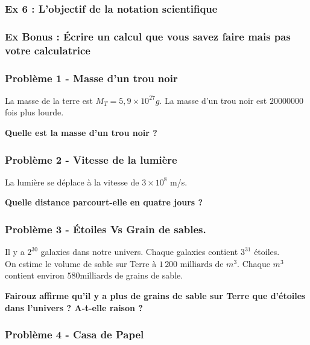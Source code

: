 \subsubsection*{Ex 6 : L'objectif de la notation scientifique}
\Pointilles[2]

\subsubsection*{Ex Bonus : Écrire un calcul que vous savez faire mais pas votre calculatrice}
\Pointilles[2]


\newpage

\subsubsection*{Problème 1 - Masse d'un trou noir}

La masse de la terre est $M_T = 5,9 \times 10^27 g$. La masse d'un trou noir est $\SI{20000000}{}$ fois plus lourde. 

\textbf{Quelle est la masse d'un trou noir ?}

\Pointilles[4]

\subsubsection*{Problème 2 - Vitesse de la lumière}

La lumière se déplace à la vitesse de $3 \times 10^8$ m/s. 

\textbf{Quelle distance parcourt-elle en quatre jours ?}

\Pointilles[4]

\subsubsection*{Problème 3 - Étoiles Vs Grain de sables.}

Il y a $2^{30}$ galaxies dans notre univers. Chaque galaxies contient $3^{31}$ étoiles.  \\
On estime le volume de sable sur Terre à $1\,200 \text{ milliards de } m^3$. Chaque $m^3$ contient environ $580 \text{milliards}$ de grains de sable. 

\textbf{Fairouz affirme qu'il y a plus de grains de sable sur Terre que d'étoiles dans l'univers ? A-t-elle raison ?}

\Pointilles[4]

\subsubsection*{Problème 4 - Casa de Papel}

